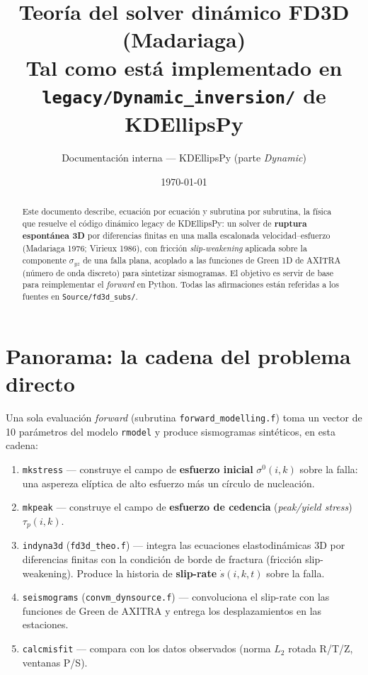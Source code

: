 \documentclass[11pt,a4paper]{article}
\title{\textbf{Teoría del solver dinámico FD3D (Madariaga)}\\
       \large Tal como está implementado en \texttt{legacy/Dynamic\_inversion/} de KDEllipsPy}
\author{Documentación interna --- KDEllipsPy (parte \emph{Dynamic})}
\date{\today}
\begin{document}
\maketitle

\begin{abstract}
Este documento describe, ecuación por ecuación y subrutina por subrutina, la
física que resuelve el código dinámico legacy de KDEllipsPy: un solver de
\textbf{ruptura espontánea 3D} por diferencias finitas en una malla escalonada
velocidad--esfuerzo (Madariaga 1976; Virieux 1986), con fricción
\emph{slip-weakening} aplicada sobre la componente $\sigma_{yz}$ de una falla
plana, acoplado a las funciones de Green 1D de AXITRA (número de onda discreto)
para sintetizar sismogramas. El objetivo es servir de base para reimplementar el
\emph{forward} en Python. Todas las afirmaciones están referidas a los fuentes
en \texttt{Source/fd3d\_subs/}.
\end{abstract}

\tableofcontents

\section{Panorama: la cadena del problema directo}

Una sola evaluación \emph{forward} (subrutina \texttt{forward\_modelling.f})
toma un vector de 10 parámetros del modelo \texttt{rmodel} y produce sismogramas
sintéticos, en esta cadena:

\begin{enumerate}
  \item \texttt{mkstress} --- construye el campo de \textbf{esfuerzo inicial}
        $\sigma^0(i,k)$ sobre la falla: una aspereza elíptica de alto esfuerzo
        más un círculo de nucleación.
  \item \texttt{mkpeak} --- construye el campo de \textbf{esfuerzo de cedencia}
        (\emph{peak/yield stress}) $\tau_p(i,k)$.
  \item \texttt{indyna3d} (\texttt{fd3d\_theo.f}) --- integra las ecuaciones
        elastodinámicas 3D por diferencias finitas con la condición de borde de
        fractura (fricción slip-weakening). Produce la historia de
        \textbf{slip-rate} $\dot{s}(i,k,t)$ sobre la falla.
  \item \texttt{seismograms} (\texttt{convm\_dynsource.f}) --- convoluciona el
        slip-rate con las funciones de Green de AXITRA y entrega los
        desplazamientos en las estaciones.
  \item \texttt{calcmisfit} --- compara con los datos observados (norma $L_2$
        rotada R/T/Z, ventanas P/S).
\end{enumerate}
\end{document}
